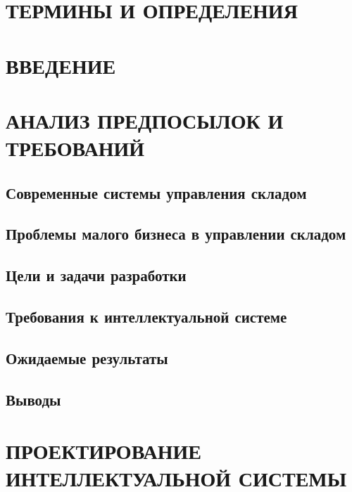 \documentclass[12pt]{article}
\begin{document}
\begin{titlepage}



\section*{ТЕРМИНЫ И ОПРЕДЕЛЕНИЯ}

\section*{ВВЕДЕНИЕ}

\newpage
\section{АНАЛИЗ ПРЕДПОСЫЛОК И ТРЕБОВАНИЙ}
\subsection{Современные системы управления складом}
\subsection{Проблемы малого бизнеса в управлении складом}
\subsection{Цели и задачи разработки}
\subsection{Требования к интеллектуальной системе}
\subsection{Ожидаемые результаты}
\subsection{Выводы}

\newpage
\section{ПРОЕКТИРОВАНИЕ ИНТЕЛЛЕКТУАЛЬНОЙ СИСТЕМЫ}

\end{titlepage}
\end{document}
